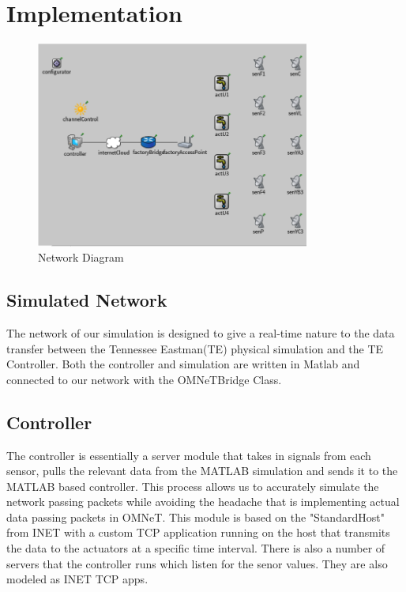\section{Implementation}

\begin{figure}[ht!]
        \centering
		\includegraphics[width=90mm]{figs/network.png}
        \caption{Network Diagram}
        \label{fig:network}        
\end{figure}

\subsection{Simulated Network}

The network of our simulation is designed to give a real-time nature to the data transfer between the Tennessee Eastman(TE) physical simulation and the TE Controller. Both the controller and simulation are written in Matlab and connected to our network with the OMNeTBridge Class. 


\subsection{Controller}

The controller is essentially a server module that takes in signals from each sensor, pulls the relevant data from the MATLAB simulation and sends it to the MATLAB based controller. This process allows us to accurately simulate the network passing packets while avoiding the headache that is implementing actual data passing packets in OMNeT. This module is based on the "StandardHost" from INET with a custom TCP application running on the host that transmits the data to the actuators at a specific time interval. There is also a number of servers that the controller runs which listen for the senor values. They are also modeled as INET TCP apps. 


